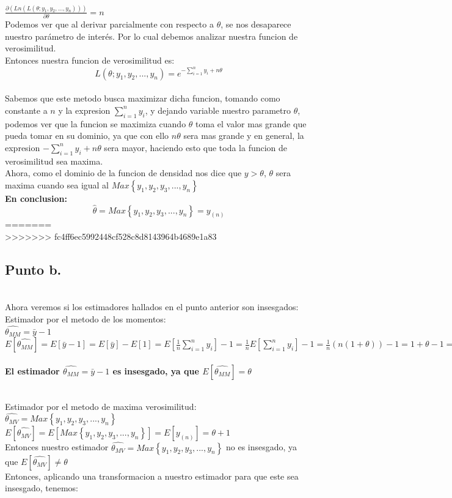 \documentclass[letterpaper,12pt,onecolumn,titlepage]{article}
\begin{document}
~\\ $\frac{\partial(Ln(L(\theta;y_{1},y_{2},...,y_{n})))}{\partial\theta}= n$
~\\ Podemos ver que al derivar parcialmente con respecto a $\theta$, se nos desaparece nuestro par\'{a}metro de inter\'{e}s. Por lo cual debemos analizar nuestra funcion de verosimilitud. 
~\\ Entonces nuestra funcion de verosimilitud es: 
$$L(\theta; y_{1},y_{2},...,y_{n})=e^{-\sum \limits_{i=1}^n y_{i} + n\theta}$$
~\\ Sabemos que este metodo busca maximizar dicha funcion, tomando como constante a $n$ y la expresion $\sum \limits_{i=1}^n y_{i}$, y dejando variable nuestro parametro $\theta$, podemos ver que la funcion se maximiza cuando $\theta$ toma el valor mas grande que pueda tomar en su dominio, ya que con ello $n\theta$ sera mas grande y en general, la expresion $-\sum \limits_{i=1}^n y_{i} + n\theta$ sera mayor, haciendo esto que toda la funcion de verosimilitud sea maxima. 
~\\ Ahora, como el dominio de la funcion de densidad nos dice que $y>\theta$, $\theta$ sera maxima cuando sea igual al $Max\left\lbrace{y_{1},y_{2},y_{3},...,y_{n}}\right\rbrace$
~\\ \textbf{En conclusion:}
$$\hat{\theta}=Max\left\lbrace{y_{1},y_{2},y_{3},...,y_{n}}\right\rbrace=y_{(n)}$$
=======
~\\
>>>>>>> fc4ff6ec5992448cf528c8d8143964b4689e1a83

\subsection{Punto b.}
~\\ Ahora veremos si los estimadores hallados en el punto anterior son insesgados:
~\\ Estimador por el metodo de los momentos:
~\\ $\hat{\theta_{MM}}=\bar{y}-1$
~\\ $E[\hat{\theta_{MM}}]=E[\bar{y}-1]=E[\bar{y}]-E[1]=E[\frac{1}{n}\sum \limits_{i=1}^{n} y_{i}]-1=\frac{1}{n} E[\sum \limits_{i=1}^{n} y_{i}]-1=\frac{1}{n}(n(1+\theta))-1=1+\theta-1=\theta$
~\\ \textbf{El estimador $\hat{\theta_{MM}}=\bar{y}-1$ es insesgado, ya que  $E[\hat{\theta_{MM}}]=\theta$}

~\\ Estimador por el metodo de maxima verosimilitud:
~\\ $\hat{\theta_{MV}}=Max\left\lbrace{y_{1},y_{2},y_{3},...,y_{n}}\right\rbrace$
~\\ $E[\hat{\theta_{MV}}]=E[Max\left\lbrace{y_{1},y_{2},y_{3},...,y_{n}}\right\rbrace]=E[y_{(n)}]=\theta+1$
~\\ Entonces nuestro estimador  $\hat{\theta_{MV}}=Max\left\lbrace{y_{1},y_{2},y_{3},...,y_{n}}\right\rbrace$ no es insesgado, ya que $E[\hat{\theta_{MV}}]\neq \theta$
~\\ Entonces, aplicando una transformacion a nuestro estimador para que este sea insesgado, tenemos:
\end{document}
